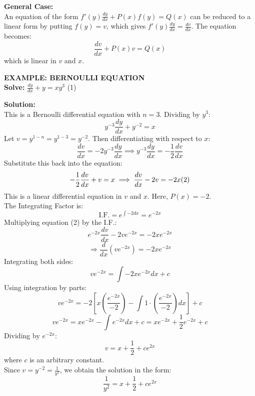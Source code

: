 \documentclass[11pt,a4paper]{article}
\begin{document}
\vspace{0.2cm}
\noindent\textbf{\textcolor{DeepNavy}{General Case:}} \\
An equation of the form $f'(y)\frac{dy}{dx} + P(x)f(y) = Q(x)$ can be reduced to a linear form by putting $f(y) = v$, which gives $f'(y)\frac{dy}{dx} = \frac{dv}{dx}$. The equation becomes:
\[ \frac{dv}{dx} + P(x)v = Q(x) \]
which is linear in $v$ and $x$.

\begin{tcolorbox}[colback=LightBg, colframe=BorderGray, arc=4mm]
    {\small\textbf{\textcolor{AccentBlue}{EXAMPLE: BERNOULLI EQUATION}}}
    \vspace{0.2cm}\\
    \textbf{Solve:} $\displaystyle \frac{dy}{dx} + y = xy^3$ \hfill (1)
    
    \vspace{0.2cm}
    \textbf{Solution:} \\
    This is a Bernoulli differential equation with $n=3$. Dividing by $y^3$:
    \[ y^{-3}\frac{dy}{dx} + y^{-2} = x \]
    Let $v = y^{1-n} = y^{1-3} = y^{-2}$. Then differentiating with respect to $x$:
    \[ \frac{dv}{dx} = -2y^{-3}\frac{dy}{dx} \implies y^{-3}\frac{dy}{dx} = -\frac{1}{2}\frac{dv}{dx} \]
    Substitute this back into the equation:
    \[ -\frac{1}{2}\frac{dv}{dx} + v = x \implies \frac{dv}{dx} - 2v = -2x \hfill (2) \]
    This is a linear differential equation in $v$ and $x$. Here, $P(x) = -2$. \\
    The Integrating Factor is:
    \[ \text{I.F.} = e^{\int -2 dx} = e^{-2x} \]
    Multiplying equation (2) by the I.F.:
    \[ e^{-2x}\frac{dv}{dx} - 2v e^{-2x} = -2x e^{-2x} \]
    \[ \Rightarrow \frac{d}{dx} \left( v e^{-2x} \right) = -2x e^{-2x} \]
    Integrating both sides:
    \[ v e^{-2x} = \int -2x e^{-2x} dx + c \]
    Using integration by parts:
    \[ v e^{-2x} = -2 \left[ x\left(\frac{e^{-2x}}{-2}\right) - \int 1 \cdot \left(\frac{e^{-2x}}{-2}\right) dx \right] + c \]
    \[ v e^{-2x} = x e^{-2x} - \int e^{-2x} dx + c = x e^{-2x} + \frac{1}{2} e^{-2x} + c \]
    Dividing by $e^{-2x}$:
    \[ v = x + \frac{1}{2} + c e^{2x} \]
    where $c$ is an arbitrary constant. \\
    Since $v = y^{-2} = \frac{1}{y^2}$, we obtain the solution in the form:
    \[ \frac{1}{y^2} = x + \frac{1}{2} + c e^{2x} \]
\end{tcolorbox}
\end{document}
